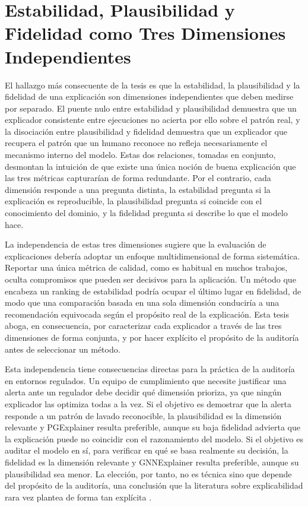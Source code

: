 \section{Estabilidad, Plausibilidad y Fidelidad como Tres Dimensiones Independientes}

El hallazgo más consecuente de la tesis es que la estabilidad, la plausibilidad y la fidelidad de una explicación son dimensiones independientes que deben medirse por separado. El puente nulo entre estabilidad y plausibilidad demuestra que un explicador consistente entre ejecuciones no acierta por ello sobre el patrón real, y la disociación entre plausibilidad y fidelidad demuestra que un explicador que recupera el patrón que un humano reconoce no refleja necesariamente el mecanismo interno del modelo. Estas dos relaciones, tomadas en conjunto, desmontan la intuición de que existe una única noción de buena explicación que las tres métricas capturarían de forma redundante. Por el contrario, cada dimensión responde a una pregunta distinta, la estabilidad pregunta si la explicación es reproducible, la plausibilidad pregunta si coincide con el conocimiento del dominio, y la fidelidad pregunta si describe lo que el modelo hace.

La independencia de estas tres dimensiones sugiere que la evaluación de explicaciones debería adoptar un enfoque multidimensional de forma sistemática. Reportar una única métrica de calidad, como es habitual en muchos trabajos, oculta compromisos que pueden ser decisivos para la aplicación. Un método que encabeza un ranking de estabilidad podría ocupar el último lugar en fidelidad, de modo que una comparación basada en una sola dimensión conduciría a una recomendación equivocada según el propósito real de la explicación. Esta tesis aboga, en consecuencia, por caracterizar cada explicador a través de las tres dimensiones de forma conjunta, y por hacer explícito el propósito de la auditoría antes de seleccionar un método.

Esta independencia tiene consecuencias directas para la práctica de la auditoría en entornos regulados. Un equipo de cumplimiento que necesite justificar una alerta ante un regulador debe decidir qué dimensión prioriza, ya que ningún explicador las optimiza todas a la vez. Si el objetivo es demostrar que la alerta responde a un patrón de lavado reconocible, la plausibilidad es la dimensión relevante y PGExplainer resulta preferible, aunque su baja fidelidad advierta que la explicación puede no coincidir con el razonamiento del modelo. Si el objetivo es auditar el modelo en sí, para verificar en qué se basa realmente su decisión, la fidelidad es la dimensión relevante y GNNExplainer resulta preferible, aunque su plausibilidad sea menor. La elección, por tanto, no es técnica sino que depende del propósito de la auditoría, una conclusión que la literatura sobre explicabilidad rara vez plantea de forma tan explícita \cite{Agarwal2022ProbingMethods, Adadi2018PeekingXAI}.

